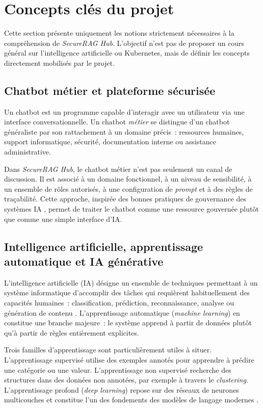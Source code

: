 \section{Concepts clés du projet}
\label{sec:concepts}

Cette section présente uniquement les notions strictement nécessaires à la compréhension de \textit{SecureRAG Hub}. L'objectif n'est pas de proposer un cours général sur l'intelligence artificielle ou Kubernetes, mais de définir les concepts directement mobilisés par le projet.

\subsection{Chatbot métier et plateforme sécurisée}

Un chatbot est un programme capable d'interagir avec un utilisateur via une interface conversationnelle. Un chatbot \textit{métier} se distingue d'un chatbot généraliste par son rattachement à un domaine précis~: ressources humaines, support informatique, sécurité, documentation interne ou assistance administrative.

Dans \textit{SecureRAG Hub}, le chatbot métier n'est pas seulement un canal de discussion. Il est associé à un domaine fonctionnel, à un niveau de sensibilité, à un ensemble de rôles autorisés, à une configuration de \textit{prompt} et à des règles de traçabilité. Cette approche, inspirée des bonnes pratiques de gouvernance des systèmes IA \cite{nist_ai_rmf_2023}, permet de traiter le chatbot comme une ressource gouvernée plutôt que comme une simple interface d'IA.

\subsection{Intelligence artificielle, apprentissage automatique et IA générative}

L'intelligence artificielle (IA) désigne un ensemble de techniques permettant à un système informatique d'accomplir des tâches qui requièrent habituellement des capacités humaines~: classification, prédiction, reconnaissance, analyse ou génération de contenu \cite{russell_norvig_ai}. L'apprentissage automatique (\textit{machine learning}) en constitue une branche majeure~: le système apprend à partir de données plutôt qu'à partir de règles entièrement explicites.

Trois familles d'apprentissage sont particulièrement utiles à situer. L'apprentissage supervisé utilise des exemples annotés pour apprendre à prédire une catégorie ou une valeur. L'apprentissage non supervisé recherche des structures dans des données non annotées, par exemple à travers le \textit{clustering}. L'apprentissage profond (\textit{deep learning}) repose sur des réseaux de neurones multicouches et constitue l'un des fondements des modèles de langage modernes \cite{russell_norvig_ai,goodfellow_deep_learning,lecun_deep_learning_2015}.

